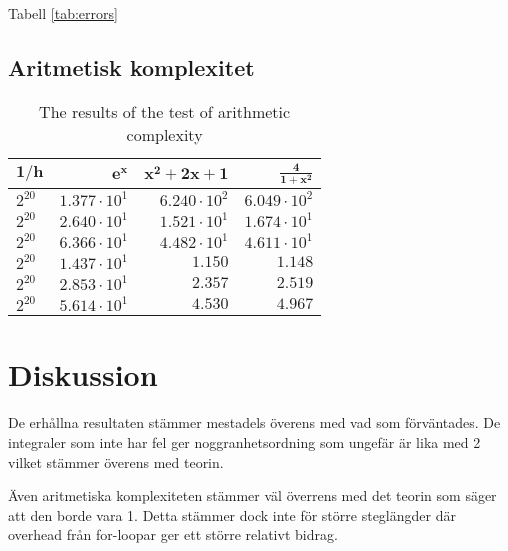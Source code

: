 \documentclass[a4paper,titlepage]{article}
\begin{document}
Tabell \ref{tab:errors}

\subsection{Aritmetisk komplexitet}

\begin{table}[h]
    \centering
    \begin{tabular}{l | r | r | r}
        $\mathbf{1/h}$ & $\mathbf{e^x}$         & $\mathbf{x^2 + 2x + 1}$ &  $\mathbf{\frac{4}{1 + x^2}}$ & \\ \hline
        $2^{20}$       & $ 1.377 \cdot 10^{1} $ & $ 6.240 \cdot 10^{2} $  & $ 6.049 \cdot 10^{2}          $ \\
        $2^{20}$       & $ 2.640 \cdot 10^{1} $ & $ 1.521 \cdot 10^{1} $  & $ 1.674 \cdot 10^{1}          $ \\
        $2^{20}$       & $ 6.366 \cdot 10^{1} $ & $ 4.482 \cdot 10^{1} $  & $ 4.611 \cdot 10^{1}          $ \\
        $2^{20}$       & $ 1.437 \cdot 10^{1} $ & $ 1.150              $  & $ 1.148                       $ \\
        $2^{20}$       & $ 2.853 \cdot 10^{1} $ & $ 2.357              $  & $ 2.519                       $ \\
        $2^{20}$       & $ 5.614 \cdot 10^{1} $ & $ 4.530              $  & $ 4.967                       $ \\

    \end{tabular}
    \caption{The results of the test of arithmetic complexity}
\end{table}


\section{Diskussion}

De erhållna resultaten stämmer mestadels överens med vad som förväntades. De integraler
som inte har fel ger noggranhetsordning som ungefär är lika med 2 vilket stämmer överens
med teorin.

Även aritmetiska komplexiteten stämmer väl överrens med det teorin som säger att
den borde vara 1. Detta stämmer dock inte för större steglängder där overhead från
for-loopar ger ett större relativt bidrag.
\end{document}
